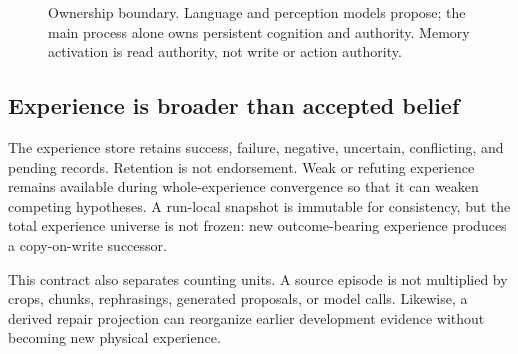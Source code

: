 \documentclass[11pt]{article}
\begin{document}
\begin{figure}[t]
\centering
{}
\caption{Ownership boundary.  Language and perception models propose; the main process alone owns persistent cognition and authority.  Memory activation is read authority, not write or action authority.}
\label{fig:architecture}
\end{figure}

\subsection{Experience is broader than accepted belief}

The experience store retains success, failure, negative, uncertain, conflicting, and pending records.  Retention is not endorsement.  Weak or refuting experience remains available during whole-experience convergence so that it can weaken competing hypotheses.  A run-local snapshot is immutable for consistency, but the total experience universe is not frozen: new outcome-bearing experience produces a copy-on-write successor.

This contract also separates counting units.  A source episode is not multiplied by crops, chunks, rephrasings, generated proposals, or model calls.  Likewise, a derived repair projection can reorganize earlier development evidence without becoming new physical experience.
\end{document}
